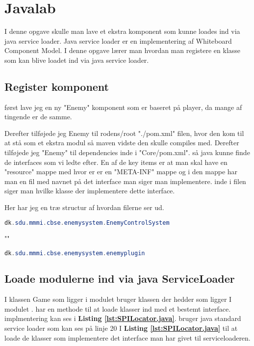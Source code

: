 \section{Javalab}
I denne opgave skulle man lave et ekstra komponent som kunne loades ind via
java service loader. Java service loader er en implementering af Whiteboard
Component Model. I denne opgave lærer man hvordan man registere en klasse som
kan blive loadet ind via java service loader.


\subsection{Register komponent}
først lave jeg en ny "Enemy" komponent som er baseret på player, da mange af
tingende er de samme. 

Derefter tilføjede jeg Enemy til rodens/root "./pom.xml" filen, hvor den kom
til at stå som et ekstra modul så maven vidste den skulle compiles med.
Derefter tilføjede jeg "Enemy" til dependencies inde i "Core/pom.xml". så java
kunne finde de interfaces som vi ledte efter.  En af de key items er at man
skal have en "resource" mappe med hvor er er en "META-INF" mappe og i den mappe
har man en fil med navnet på det interface man siger man implementere. inde i filen
siger man hvilke klasse der implementere dette interface.

Her har jeg en træ structur af hvordan filerne ser ud.

\hfill \linebreak \hline 
{}
\hline \hfill \linebreak

\begin{lstlisting}[caption={dk.sdu.mmmi.cbse.common.services.IEntityProcessingService}, label={lst:App}, language=java]
dk.sdu.mmmi.cbse.enemysystem.EnemyControlSystem
\end{lstlisting}
""
\begin{lstlisting}[caption={dk.sdu.mmmi.cbse.common.services.igamepluginservice}, label={lst:app}, language=java]
dk.sdu.mmmi.cbse.enemysystem.enemyplugin
\end{lstlisting}


\subsection{Loade modulerne ind via java ServiceLoader}
I klassen Game som ligger i modulet  bruger klassen der hedder
 som ligger I modulet .  har en
methode til at loade klasser ind med et bestemt interface. 
implmentering kan ses i \textbf{Listing \ref{lst:SPILocator.java}}.
 bruger java standard service loader som kan ses på linje 20
I \textbf{Listing \ref{lst:SPILocator.java}} til at loade de klasser som
implementere det interface man har givet til serviceloaderen. 


